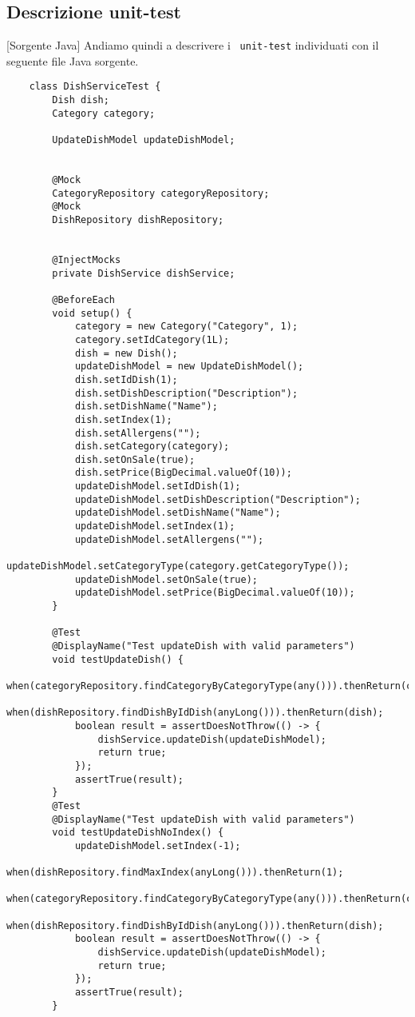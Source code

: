\newpage
\subsection{Descrizione unit-test}[Sorgente Java]
Andiamo quindi a descrivere i \texttt{\color{ddchaptercolor!80!black}\theenumi\ unit-test} individuati
con il seguente file Java sorgente.

\label{elsrc:DishServiceTest}
\begin{verbatim}
	class DishServiceTest {
		Dish dish;
		Category category;

		UpdateDishModel updateDishModel;


		@Mock
		CategoryRepository categoryRepository;
		@Mock
		DishRepository dishRepository;


		@InjectMocks
		private DishService dishService;

		@BeforeEach
		void setup() {
			category = new Category("Category", 1);
			category.setIdCategory(1L);
			dish = new Dish();
			updateDishModel = new UpdateDishModel();
			dish.setIdDish(1);
			dish.setDishDescription("Description");
			dish.setDishName("Name");
			dish.setIndex(1);
			dish.setAllergens("");
			dish.setCategory(category);
			dish.setOnSale(true);
			dish.setPrice(BigDecimal.valueOf(10));
			updateDishModel.setIdDish(1);
			updateDishModel.setDishDescription("Description");
			updateDishModel.setDishName("Name");
			updateDishModel.setIndex(1);
			updateDishModel.setAllergens("");
			updateDishModel.setCategoryType(category.getCategoryType());
			updateDishModel.setOnSale(true);
			updateDishModel.setPrice(BigDecimal.valueOf(10));
		}

		@Test
		@DisplayName("Test updateDish with valid parameters")
		void testUpdateDish() {
			when(categoryRepository.findCategoryByCategoryType(any())).thenReturn(category);
			when(dishRepository.findDishByIdDish(anyLong())).thenReturn(dish);
			boolean result = assertDoesNotThrow(() -> {
				dishService.updateDish(updateDishModel);
				return true;
			});
			assertTrue(result);
		}
		@Test
		@DisplayName("Test updateDish with valid parameters")
		void testUpdateDishNoIndex() {
			updateDishModel.setIndex(-1);
			when(dishRepository.findMaxIndex(anyLong())).thenReturn(1);
			when(categoryRepository.findCategoryByCategoryType(any())).thenReturn(category);
			when(dishRepository.findDishByIdDish(anyLong())).thenReturn(dish);
			boolean result = assertDoesNotThrow(() -> {
				dishService.updateDish(updateDishModel);
				return true;
			});
			assertTrue(result);
		}


\end{verbatim}
